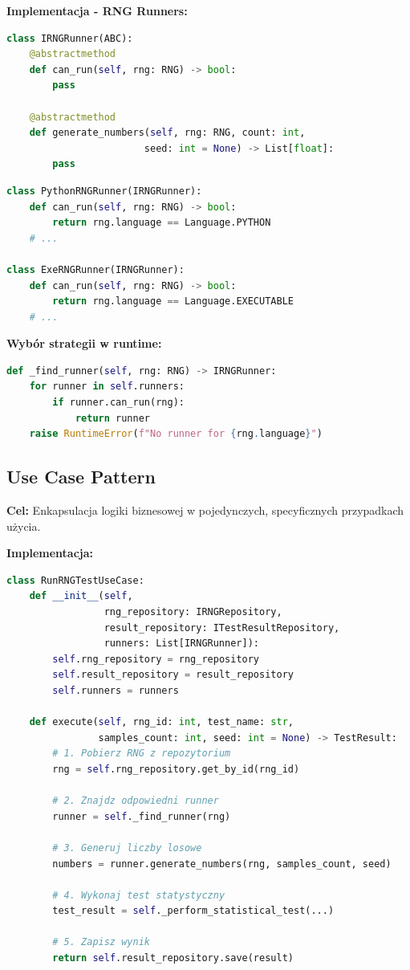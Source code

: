 \documentclass[12pt,a4paper]{article}
\begin{document}
\textbf{Implementacja - RNG Runners:}

\begin{lstlisting}[language=Python, caption=Interface strategii]
class IRNGRunner(ABC):
    @abstractmethod
    def can_run(self, rng: RNG) -> bool:
        pass
    
    @abstractmethod
    def generate_numbers(self, rng: RNG, count: int, 
                        seed: int = None) -> List[float]:
        pass
\end{lstlisting}

\begin{lstlisting}[language=Python, caption=Konkretne strategie]
class PythonRNGRunner(IRNGRunner):
    def can_run(self, rng: RNG) -> bool:
        return rng.language == Language.PYTHON
    # ...

class ExeRNGRunner(IRNGRunner):
    def can_run(self, rng: RNG) -> bool:
        return rng.language == Language.EXECUTABLE
    # ...
\end{lstlisting}

\textbf{Wybór strategii w runtime:}
\begin{lstlisting}[language=Python]
def _find_runner(self, rng: RNG) -> IRNGRunner:
    for runner in self.runners:
        if runner.can_run(rng):
            return runner
    raise RuntimeError(f"No runner for {rng.language}")
\end{lstlisting}

\newpage

\subsection{Use Case Pattern}

\textbf{Cel:} Enkapsulacja logiki biznesowej w pojedynczych, specyficznych przypadkach użycia.

\textbf{Implementacja:}

\begin{lstlisting}[language=Python, caption=Run RNG Test Use Case]
class RunRNGTestUseCase:
    def __init__(self,
                 rng_repository: IRNGRepository,
                 result_repository: ITestResultRepository,
                 runners: List[IRNGRunner]):
        self.rng_repository = rng_repository
        self.result_repository = result_repository
        self.runners = runners
    
    def execute(self, rng_id: int, test_name: str, 
                samples_count: int, seed: int = None) -> TestResult:
        # 1. Pobierz RNG z repozytorium
        rng = self.rng_repository.get_by_id(rng_id)
        
        # 2. Znajdz odpowiedni runner
        runner = self._find_runner(rng)
        
        # 3. Generuj liczby losowe
        numbers = runner.generate_numbers(rng, samples_count, seed)
        
        # 4. Wykonaj test statystyczny
        test_result = self._perform_statistical_test(...)
        
        # 5. Zapisz wynik
        return self.result_repository.save(result)
\end{lstlisting}
\end{document}
